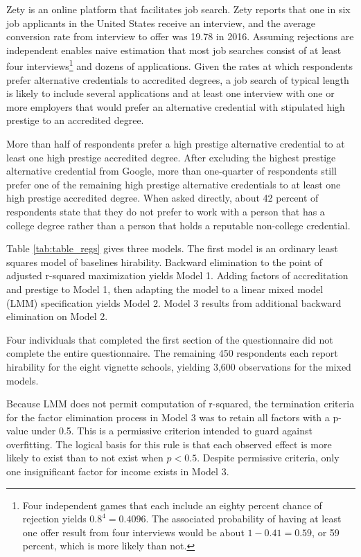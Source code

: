 \documentclass[review]{elsarticle}
\begin{document}
Zety is an online platform that facilitates job search.
Zety reports that one in six job applicants in the United States receive an interview,
and the average conversion rate from interview to offer was 19.78 in 2016\cite{turczynski_2021}.
Assuming rejections are independent enables naive estimation that most job searches consist of at least four interviews\footnote{
    Four independent games that each include an eighty percent chance of rejection yields $0.8^4 = 0.4096$.
    The associated probability of having at least one offer result from four interviews would be about $1 - 0.41 = 0.59$,
    or 59 percent, which is more likely than not.
} and dozens of applications.
Given the rates at which respondents prefer alternative credentials to accredited degrees,
a job search of typical length is likely to include several applications and at least one interview
with one or more employers that would prefer an alternative credential with stipulated high prestige to an accredited degree.

More than half of respondents prefer a high prestige alternative credential to at least one high prestige accredited degree.
After excluding the highest prestige alternative credential from Google,
more than one-quarter of respondents still prefer one of the remaining high prestige alternative credentials to at least one high prestige accredited degree.
When asked directly, about 42 percent of respondents state that they do not prefer
to work with a person that has a college degree rather than a person that holds a reputable non-college credential.



Table \ref{tab:table_regs} gives three models.
The first model is an ordinary least squares model of baselines hirability.
Backward elimination to the point of adjusted r-squared maximization yields Model 1.
Adding factors of accreditation and prestige to Model 1,
then adapting the model to a linear mixed model (LMM) specification yields Model 2.
Model 3 results from additional backward elimination on Model 2.

Four individuals that completed the first section of the questionnaire
did not complete the entire questionnaire.
The remaining 450 respondents each report hirability for the eight vignette schools,
yielding 3,600 observations for the mixed models.

Because LMM does not permit computation of r-squared,
the termination criteria for the factor elimination process in Model 3
was to retain all factors with a p-value under 0.5.
This is a permissive criterion intended to guard against overfitting.
The logical basis for this rule is that each observed effect is
more likely to exist than to not exist when $p < 0.5$.
Despite permissive criteria, only one insignificant factor for income exists in Model 3.
\end{document}
